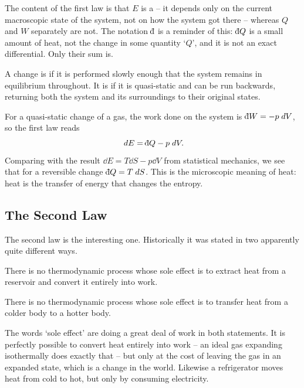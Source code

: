 \documentclass[a4paper]{scrartcl}
\newcommand{\dbar}{\mathchar'26\mkern-11mu \mathrm{d}}
\begin{document}
The content of the first law is that $E$ is a  -- it depends only on the current macroscopic state of the system, not on how the system got there -- whereas $Q$ and $W$ separately are not. The notation $\dbar$ is a reminder of this: $\dbar Q$ is a small amount of heat, not the change in some quantity `$Q$', and it is not an exact differential. Only their sum is.

\begin{definition}
	A change is  if it is performed slowly enough that the system remains in equilibrium throughout. It is  if it is quasi-static and can be run backwards, returning both the system and its surroundings to their original states.
\end{definition}

For a quasi-static change of a gas, the work done on the system is $\dbar W = -p\dd V$, so the first law reads
$$
\dd E = \dbar Q - p\dd V.
$$
Comparing with the result $\dd E = T\dd S - p\dd V$ from statistical mechanics, we see that for a reversible change $\dbar Q = T\dd S$. This is the microscopic meaning of heat: heat is the transfer of energy that changes the entropy.

\subsection{The Second Law}

The second law is the interesting one. Historically it was stated in two apparently quite different ways.

\begin{law}
	There is no thermodynamic process whose sole effect is to extract heat from a reservoir and convert it entirely into work.
\end{law}

\begin{law}
	There is no thermodynamic process whose sole effect is to transfer heat from a colder body to a hotter body.
\end{law}

The words `sole effect' are doing a great deal of work in both statements. It is perfectly possible to convert heat entirely into work -- an ideal gas expanding isothermally does exactly that -- but only at the cost of leaving the gas in an expanded state, which is a change in the world. Likewise a refrigerator moves heat from cold to hot, but only by consuming electricity.
\end{document}
